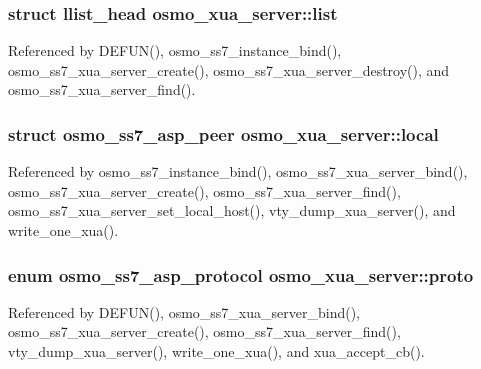 \subsubsection[{list}]{\setlength{\rightskip}{0pt plus 5cm}struct llist\+\_\+head osmo\+\_\+xua\+\_\+server\+::list}\label{structosmo__xua__server_ae23911d11adfdb7a596e12f57e78e7e4}


Referenced by D\+E\+F\+U\+N(), osmo\+\_\+ss7\+\_\+instance\+\_\+bind(), osmo\+\_\+ss7\+\_\+xua\+\_\+server\+\_\+create(), osmo\+\_\+ss7\+\_\+xua\+\_\+server\+\_\+destroy(), and osmo\+\_\+ss7\+\_\+xua\+\_\+server\+\_\+find().

\subsubsection[{local}]{\setlength{\rightskip}{0pt plus 5cm}struct {\bf osmo\+\_\+ss7\+\_\+asp\+\_\+peer} osmo\+\_\+xua\+\_\+server\+::local}\label{structosmo__xua__server_aeb2bb0edaa40ef69be129fd32a1cd931}


Referenced by osmo\+\_\+ss7\+\_\+instance\+\_\+bind(), osmo\+\_\+ss7\+\_\+xua\+\_\+server\+\_\+bind(), osmo\+\_\+ss7\+\_\+xua\+\_\+server\+\_\+create(), osmo\+\_\+ss7\+\_\+xua\+\_\+server\+\_\+find(), osmo\+\_\+ss7\+\_\+xua\+\_\+server\+\_\+set\+\_\+local\+\_\+host(), vty\+\_\+dump\+\_\+xua\+\_\+server(), and write\+\_\+one\+\_\+xua().

\subsubsection[{proto}]{\setlength{\rightskip}{0pt plus 5cm}enum {\bf osmo\+\_\+ss7\+\_\+asp\+\_\+protocol} osmo\+\_\+xua\+\_\+server\+::proto}\label{structosmo__xua__server_a1c68bd03df7e50771cd148d8354549bd}


Referenced by D\+E\+F\+U\+N(), osmo\+\_\+ss7\+\_\+xua\+\_\+server\+\_\+bind(), osmo\+\_\+ss7\+\_\+xua\+\_\+server\+\_\+create(), osmo\+\_\+ss7\+\_\+xua\+\_\+server\+\_\+find(), vty\+\_\+dump\+\_\+xua\+\_\+server(), write\+\_\+one\+\_\+xua(), and xua\+\_\+accept\+\_\+cb().

